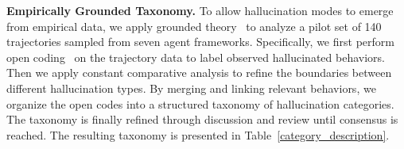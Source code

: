 \noindent\textbf{Empirically Grounded Taxonomy.}
To allow hallucination modes to emerge from empirical data, we apply grounded theory~\cite{glaser2017discovery} to analyze a pilot set of 140 trajectories sampled from seven agent frameworks. Specifically, we first perform open coding~\cite{khandkar2009open} on the trajectory data to label observed hallucinated behaviors. Then we apply constant comparative analysis to refine the boundaries between different hallucination types. By merging and linking relevant behaviors, we organize the open codes into a structured taxonomy of hallucination categories. The taxonomy is finally refined through discussion and review until consensus is reached. The resulting taxonomy is presented in Table~\ref{category_description}.





